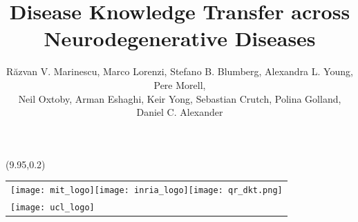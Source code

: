 \documentclass[portrait,a0,final,20pt]{a0poster}
\title{Disease Knowledge Transfer across Neurodegenerative Diseases}
\author{\LARGE{R\u{a}zvan V. Marinescu, Marco Lorenzi, Stefano B. Blumberg, Alexandra L. Young, Pere Morell},\\ \LARGE{Neil Oxtoby, Arman Eshaghi, Keir Yong, Sebastian Crutch, Polina Golland, Daniel C. Alexander}\\}
\begin{document}
\hspace{-1cm}	
\begin{minipage}{50cm}					%
\maketitle
\end{minipage}
\begin{textblock}{0}(9.95,0.2)
\begin{tabular}{l}
\texttt{[image: mit\_logo]}\texttt{[image: inria\_logo]}\texttt{[image: qr\_dkt.png]}\\
\hspace{11.45cm}\texttt{[image: ucl\_logo]}\\
\end{tabular}


\end{textblock}
\end{document}
